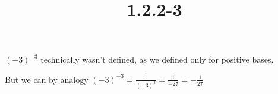 \documentclass{article}
\title{1.2.2-3}
\begin{document}
\maketitle

\( (-3)^{-3} \) technically wasn't defined, as we defined only for positive bases.

But we can by analogy \( (-3)^{-3} = \frac{1}{(-3)^3} = \frac{1}{-27} = -\frac{1}{27} \)
\end{document}
